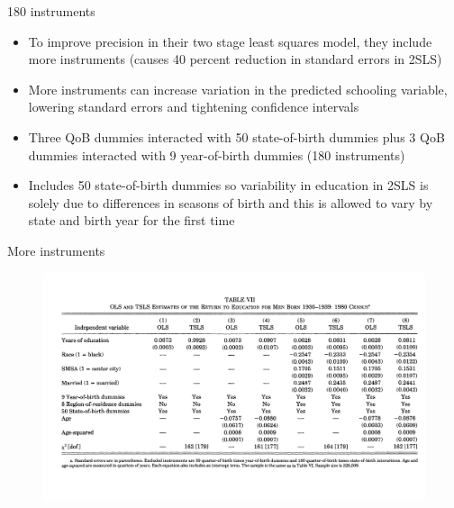 \documentclass{beamer}
\begin{document}
\begin{frame}{180 instruments}

\begin{itemize}
\item To improve precision in their two stage least squares model, they include more instruments (causes 40 percent reduction in standard errors in 2SLS)
\item More instruments can increase variation in the predicted schooling variable, lowering standard errors and tightening confidence intervals
\item Three QoB dummies interacted with 50 state-of-birth dummies plus 3 QoB dummies interacted with 9 year-of-birth dummies (180 instruments)
\item Includes 50 state-of-birth dummies so variability in education in 2SLS is solely due to differences in seasons of birth and this is allowed to vary by state and birth year for the first time
\end{itemize}

\end{frame}

	






	



\begin{frame}{More instruments}

	\begin{figure}
	\includegraphics[scale=.18]{./lecture_includes/weak_qob3.png}
	\end{figure}
	

\end{frame}
\end{document}
